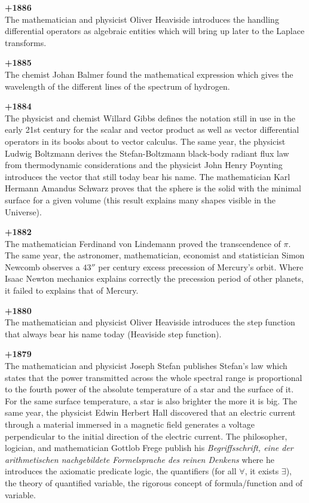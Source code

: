 \textbf{+1886}\\
The mathematician and physicist Oliver Heaviside introduces the handling differential operators as algebraic entities which will bring up later to the Laplace transforms.

\textbf{+1885}\\
The chemist Johan Balmer found the mathematical expression which gives the wavelength of the different lines of the spectrum of hydrogen.

\textbf{+1884}\\
The physicist and chemist Willard Gibbs defines the notation still in use in the early 21st century for the scalar and vector product as well as vector differential operators in its books about to vector calculus. The same year, the physicist Ludwig Boltzmann derives the Stefan-Boltzmann black-body radiant flux law from thermodynamic considerations and the physicist John Henry Poynting introduces the vector that still today bear his name. The mathematician Karl Hermann Amandus Schwarz proves that the sphere is the solid with the minimal surface for a given volume (this result explains many shapes visible in the Universe).

\textbf{+1882}\\
The mathematician Ferdinand von Lindemann proved the transcendence of $\pi$. The same year, the astronomer, mathematician, economist and statistician Simon Newcomb observes a $43''$ per century excess precession of Mercury's orbit. Where Isaac Newton mechanics explains correctly the precession period of other planets, it failed to explains that of Mercury.

\textbf{+1880}\\
The mathematician and physicist Oliver Heaviside introduces the step function that always bear his name today (Heaviside step function).

\textbf{+1879}\\
The mathematician and physicist Joseph Stefan publishes Stefan's law which states that the power transmitted across the whole spectral range is proportional to the fourth power of the absolute temperature of a star and the surface of it. For the same surface temperature, a star is also brighter the more it is big. The same year, the physicist Edwin Herbert Hall discovered that an electric current through a material immersed in a magnetic field generates a voltage perpendicular to the initial direction of the electric current. The philosopher, logician, and mathematician Gottlob Frege publish his \textit{Begriffsschrift, eine der arithmetischen nachgebildete Formelsprache des reinen Denkens} where he introduces the axiomatic predicate logic, the quantifiers (for all $\forall$, it exists $\exists$), the theory of quantified variable, the rigorous concept of formula/function and of variable.

